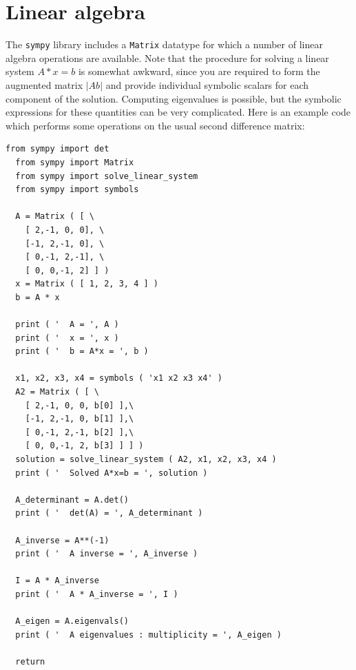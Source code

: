 \documentclass{article}
\begin{document}
\section{Linear algebra}

The {\tt{sympy}} library includes a {\tt{Matrix}} datatype
for which a number of linear algebra operations are available.
Note that the procedure for solving a linear system $A*x=b$ is somewhat awkward, since you are required to form the augmented
matrix $|Ab|$ and provide individual symbolic scalars for each
component of the solution.  Computing eigenvalues is possible,
but the symbolic expressions for these quantities can be very
complicated.
\vskip 0.1in
Here is an example code which performs some operations on the
usual second difference matrix:
\begin{lstlisting}[numbers=none]
  from sympy import det
  from sympy import Matrix
  from sympy import solve_linear_system
  from sympy import symbols

  A = Matrix ( [ \
    [ 2,-1, 0, 0], \
    [-1, 2,-1, 0], \
    [ 0,-1, 2,-1], \
    [ 0, 0,-1, 2] ] )
  x = Matrix ( [ 1, 2, 3, 4 ] )
  b = A * x

  print ( '  A = ', A )
  print ( '  x = ', x )
  print ( '  b = A*x = ', b )

  x1, x2, x3, x4 = symbols ( 'x1 x2 x3 x4' )
  A2 = Matrix ( [ \
    [ 2,-1, 0, 0, b[0] ],\
    [-1, 2,-1, 0, b[1] ],\
    [ 0,-1, 2,-1, b[2] ],\
    [ 0, 0,-1, 2, b[3] ] ] )
  solution = solve_linear_system ( A2, x1, x2, x3, x4 )
  print ( '  Solved A*x=b = ', solution )

  A_determinant = A.det()
  print ( '  det(A) = ', A_determinant )

  A_inverse = A**(-1)
  print ( '  A inverse = ', A_inverse )

  I = A * A_inverse
  print ( '  A * A_inverse = ', I )

  A_eigen = A.eigenvals()
  print ( '  A eigenvalues : multiplicity = ', A_eigen )

  return
\end{lstlisting}
  
\end{document}
